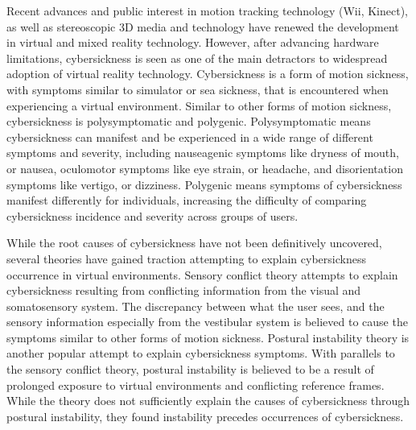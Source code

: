 Recent advances and public interest in motion tracking technology (Wii\textcopyright, Kinect\textcopyright), as well
as stereoscopic 3D media and technology have renewed the development in virtual and mixed reality technology.
However, after advancing hardware limitations, cybersickness is seen as one of the main detractors to widespread
adoption of virtual reality technology.
Cybersickness is a form of motion sickness, with symptoms similar to simulator or sea sickness, that is encountered
when experiencing a virtual environment.
Similar to other forms of motion sickness, cybersickness is polysymptomatic and polygenic.
Polysymptomatic means cybersickness can manifest and be experienced in a wide range of different symptoms and
severity, including nauseagenic symptoms like dryness of mouth, or nausea, oculomotor symptoms like eye strain, or
headache,  and disorientation symptoms like vertigo, or dizziness.
Polygenic means symptoms of cybersickness manifest differently for individuals, increasing the difficulty of
comparing cybersickness incidence and severity across groups of users.

While the root causes of cybersickness have not been definitively uncovered, several theories have gained traction
attempting to explain cybersickness occurrence in virtual environments.
Sensory conflict theory attempts to explain cybersickness resulting from conflicting information from the visual and
somatosensory system.
The discrepancy between what the user sees, and the sensory information especially from the vestibular system is
believed to cause the symptoms similar to other forms of motion sickness.
Postural instability theory is another popular attempt to explain cybersickness symptoms.
With parallels to the sensory conflict theory, postural instability is believed to be a result of prolonged exposure
to virtual environments and conflicting reference frames.
While the theory does not sufficiently explain the causes of cybersickness through postural instability, they found
instability precedes occurrences of cybersickness.

